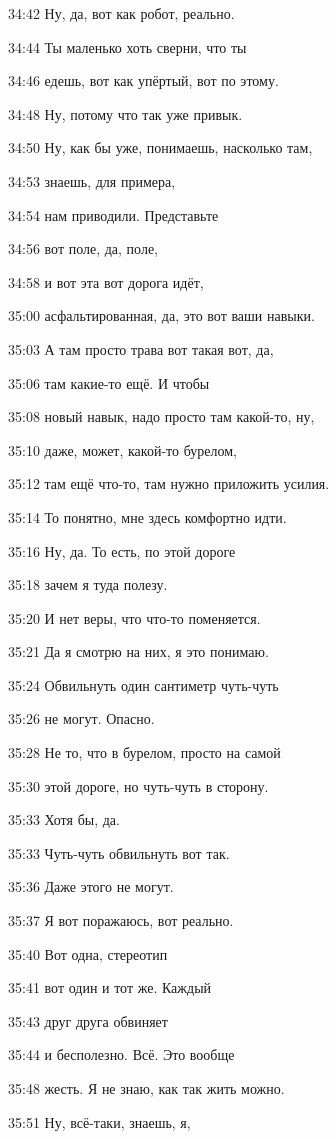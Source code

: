 34:42
Ну, да, вот как робот, реально.

34:44
Ты маленько хоть сверни, что ты

34:46
едешь, вот как упёртый, вот по этому.

34:48
Ну, потому что так уже привык.

34:50
Ну, как бы уже, понимаешь, насколько там,

34:53
знаешь, для примера,

34:54
нам приводили. Представьте

34:56
вот поле, да, поле,

34:58
и вот эта вот дорога идёт,

35:00
асфальтированная, да, это вот ваши навыки.

35:03
А там просто трава вот такая вот, да,

35:06
там какие-то ещё. И чтобы

35:08
новый навык, надо просто там какой-то, ну,

35:10
даже, может, какой-то бурелом,

35:12
там ещё что-то, там нужно приложить усилия.

35:14
То понятно, мне здесь комфортно идти.

35:16
Ну, да. То есть, по этой дороге

35:18
зачем я туда полезу.

35:20
И нет веры, что что-то поменяется.

35:21
Да я смотрю на них, я это понимаю.

35:24
Обвильнуть один сантиметр чуть-чуть

35:26
не могут. Опасно.

35:28
Не то, что в бурелом, просто на самой

35:30
этой дороге, но чуть-чуть в сторону.

35:33
Хотя бы, да.

35:33
Чуть-чуть обвильнуть вот так.

35:36
Даже этого не могут.

35:37
Я вот поражаюсь, вот реально.

35:40
Вот одна, стереотип

35:41
вот один и тот же. Каждый

35:43
друг друга обвиняет

35:44
и бесполезно. Всё. Это вообще

35:48
жесть. Я не знаю, как так жить можно.

35:51
Ну, всё-таки, знаешь, я,

